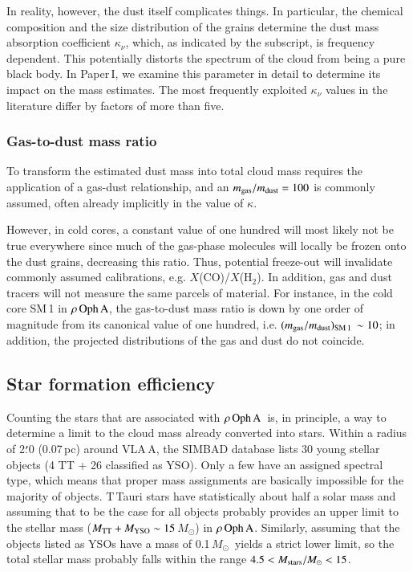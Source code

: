 \documentclass{aa}
\newcommand{\molh}{H$_{2}$}                              %
\newcommand{\msun}{$M_{\odot}$}
\newcommand{\roa}{$\rho \, {\rm Oph \, A}$}
\newcommand{\amindot}[2]{\mbox{#1$\stackrel {\prime}{_{\bf \cdot}}$#2}}
\begin{document}
In reality, however,  the dust itself complicates things. In particular, the chemical composition and the size distribution of the grains determine the dust mass absorption coefficient $\kappa_{\nu}$,  which, as indicated by the subscript, is frequency dependent. This potentially distorts the spectrum of the cloud from being a pure black body. In Paper\,I, we examine this parameter in detail to determine its impact on the mass estimates. The most frequently exploited $\kappa_{\nu}$ values in the literature differ by factors of more than five.

\subsubsection{Gas-to-dust mass ratio}

To transform the estimated dust mass into total cloud mass requires the application of a gas-dust relationship, and an $m_{\rm gas}/m_{\rm dust}=100$ is commonly assumed, often  already implicitly in the value of $\kappa$. 

However, in cold cores, a constant value of one hundred will most likely not be true everywhere since much of the gas-phase molecules will locally be frozen onto the dust grains, decreasing this ratio.  Thus, potential freeze-out will invalidate commonly assumed calibrations,  e.g. $X$(CO)/$X$(\molh). In addition, gas and dust tracers will not measure the same parcels of material. For instance, in the cold core SM\,1 in \roa, the gas-to-dust mass ratio is down by one order of magnitude from its canonical value of one hundred, i.e. $(m_{\rm gas}/m_{\rm dust})_{\rm SM\,1}\,\sim 10$;  in addition, the projected distributions of the gas and dust do not coincide.

\subsection{Star formation efficiency}

Counting the stars that are associated with \roa\ is, in principle, a way to determine a limit to the cloud mass already converted into stars. Within a radius of \amindot{2}{0} (0.07\,pc) around VLA\,A, the SIMBAD database lists 30 young stellar objects (4 TT + 26 classified as YSO). Only a few have an assigned spectral type, which means that proper mass assignments are basically impossible for the majority of objects. T\,Tauri stars have statistically about half a solar mass and assuming that to be the case for all objects probably provides an upper limit to the stellar mass ($M_{\rm TT}+M_{\rm YSO} \sim 15$\,\msun) in \roa. Similarly, assuming that the objects listed as YSOs have a mass of 0.1\,\msun\ yields a strict lower limit, so  the total stellar mass probably falls within the range $4.5 < M_{\rm stars}/M_{\odot} < 15$. 
\end{document}
